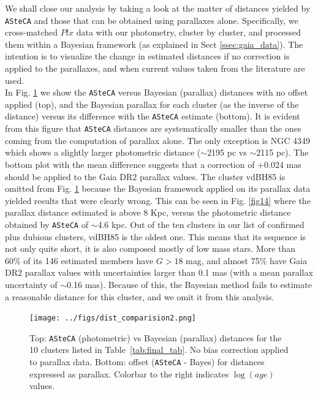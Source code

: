 \documentclass[draft]{aa}
\begin{document}
We shall close our analysis by taking a look at the matter of distances yielded
by \texttt{ASteCA} and those that can be obtained using parallaxes alone.
Specifically, we cross-matched $Plx$ data with our photometry, cluster by
cluster, and processed them within a Bayesian framework (as explained in Sect
\ref{ssec:gaia_data}). The intention is to visualize the change in estimated
distances if no correction is applied to the parallaxes, and when current
values taken from the literature are used.\\

In Fig. \ref{fig:prlxnobias} we show the \texttt{ASteCA} versus Bayesian 
(parallax) distances with no offset applied (top), and the Bayesian parallax
for each cluster (as the inverse of the distance) versus its difference with
the \texttt{ASteCA} estimate (bottom).
%
It is evident from this figure that \texttt{ASteCA} distances are
systematically smaller than the ones coming from the computation of parallax
alone. The only exception is NGC 4349 which shows a slightly larger photometric
distance ($\sim$2195 pc vs $\sim$2115 pc). The bottom plot with the mean
difference suggests that a correction of +0.024 mas should be applied to the
Gaia DR2 parallax values.
%
The cluster vdBH85 is omitted from Fig. \ref{fig:prlxnobias} because the
Bayesian framework applied on its parallax data yielded results that were
clearly wrong. This can be seen in Fig. \ref{fig14} where the parallax
distance estimated is above 8 Kpc, versus the photometric distance obtained by
\texttt{ASteCA} of $\sim$4.6 kpc. Out of the ten clusters in our list of
confirmed plus dubious clusters, vdBH85 is the oldest one. This means that its
sequence is not only quite short, it is also composed mostly of low mass stars.
More than 60\% of its 146 estimated members have $G>18$ mag, and almost
75\% have Gaia DR2 parallax values with uncertainties larger than 0.1 mas 
(with a mean parallax uncertainty of $\sim$0.16 mas). Because of this, the
Bayesian method fails to estimate a reasonable distance for this cluster,
and we omit it from this analysis.\\

\begin{figure}[ht]
    \centering
    \texttt{[image: ../figs/dist\_comparision2.png]}
    \caption{Top: \texttt{ASteCA} (photometric) vs Bayesian (parallax)
    distances for the 10 clusters listed in Table~\ref{tab:final_tab}. No bias
    correction applied to parallax data.
    Bottom: offset (\texttt{ASteCA} - Bayes) for distances expressed
    as parallax. Colorbar to the right indicates $\log(age)$ values.}
    \label{fig:prlxnobias}
\end{figure}
\end{document}
